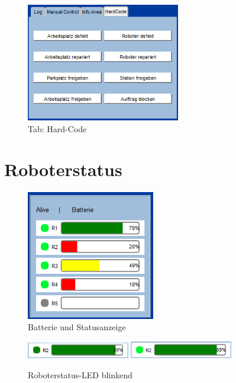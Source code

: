 \begin{figure}[htb]
    \centering
    \includegraphics[width=0.6\textwidth]{Abbildungen/HardCode.png}
    \caption{Tab: Hard-Code}		
    \label{fig:HardCode}
\end{figure}

\section{Roboterstatus}

\begin{figure}[htb]
    \centering
    \includegraphics[width=0.5\textwidth]{Abbildungen/Batterie.png}
    \caption{Batterie und Statusanzeige}		
    \label{fig:Batterie}
\end{figure}

\begin{figure}[htb]
    \centering
    \includegraphics[width=0.4\textwidth]{Abbildungen/BatterieAlive1.png}
    \includegraphics[width=0.4\textwidth]{Abbildungen/BatterieAlive2.png}
    \caption{Roboterstatus-LED blinkend}		
    \label{fig:Led}
\end{figure}

